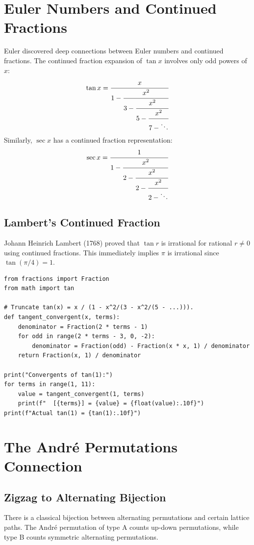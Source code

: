 \section{Euler Numbers and Continued Fractions}

Euler discovered deep connections between Euler numbers and continued fractions. The
continued fraction expansion of $\tan x$ involves only odd powers of $x$:
\[
\tan x = \cfrac{x}{1 - \cfrac{x^2}{3 - \cfrac{x^2}{5 - \cfrac{x^2}{7 - \ddots}}}}
\]
Similarly, $\sec x$ has a continued fraction representation:
\[
\sec x = \cfrac{1}{1 - \cfrac{x^2}{2 - \cfrac{x^2}{2 - \cfrac{x^2}{2 - \ddots}}}}
\]

\subsection{Lambert's Continued Fraction}

Johann Heinrich Lambert (1768) proved that $\tan r$ is irrational for rational $r \neq 0$
using continued fractions. This immediately implies $\pi$ is irrational since $\tan(\pi/4) = 1$.

\begin{lstlisting}[caption={Continued fraction for tan(x)}, label=lst:tan_cf]
from fractions import Fraction
from math import tan

# Truncate tan(x) = x / (1 - x^2/(3 - x^2/(5 - ...))).
def tangent_convergent(x, terms):
    denominator = Fraction(2 * terms - 1)
    for odd in range(2 * terms - 3, 0, -2):
        denominator = Fraction(odd) - Fraction(x * x, 1) / denominator
    return Fraction(x, 1) / denominator

print("Convergents of tan(1):")
for terms in range(1, 11):
    value = tangent_convergent(1, terms)
    print(f"  [{terms}] = {value} = {float(value):.10f}")
print(f"Actual tan(1) = {tan(1):.10f}")
\end{lstlisting}

\section{The Andr\'{e} Permutations Connection}

\subsection{Zigzag to Alternating Bijection}

There is a classical bijection between alternating permutations and certain lattice paths.
The Andr\'{e} permutation of type A counts up-down permutations, while type B counts
symmetric alternating permutations.

